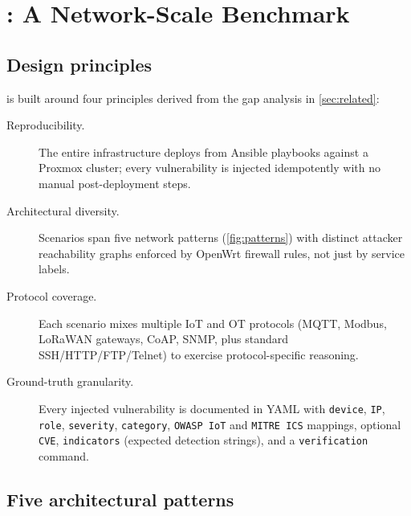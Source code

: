 
\section{\systemname: A Network-Scale Benchmark}
\label{sec:iotbench}

\subsection{Design principles}
\label{sec:iotbench:principles}

\systemname{} is built around four principles derived from the gap analysis in
\cref{sec:related}:

\begin{description}
  \item[Reproducibility.] The entire infrastructure deploys from Ansible
  playbooks against a Proxmox cluster; every vulnerability is injected
  idempotently with no manual post-deployment steps.
  \item[Architectural diversity.] Scenarios span five network patterns
  (\cref{fig:patterns}) with distinct attacker reachability graphs enforced by
  OpenWrt firewall rules, not just by service labels.
  \item[Protocol coverage.] Each scenario mixes multiple IoT and OT protocols
  (MQTT, Modbus, LoRaWAN gateways, CoAP, SNMP, plus standard SSH/HTTP/FTP/Telnet)
  to exercise protocol-specific reasoning.
  \item[Ground-truth granularity.] Every injected vulnerability is documented in
  YAML with \texttt{device}, \texttt{IP}, \texttt{role}, \texttt{severity},
  \texttt{category}, \texttt{OWASP IoT} and \texttt{MITRE ICS} mappings,
  optional \texttt{CVE}, \texttt{indicators} (expected detection strings), and
  a \texttt{verification} command.
\end{description}

\subsection{Five architectural patterns}
\label{sec:iotbench:patterns}

